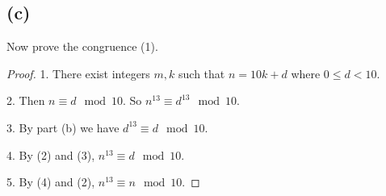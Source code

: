 \documentclass[14pt]{extarticle}
\begin{document}
\subsection{(c)}
Now prove the congruence (1).
\begin{proof}

1. There exist integers $m, k$ such that $n = 10k + d$ where $0 \leq d < 10$.

2. Then $n \equiv d \mod 10$. So $n^{13} \equiv d^{13} \mod 10$.

3. By part (b) we have $d^{13} \equiv d \mod 10$.

4. By (2) and (3), $n^{13} \equiv d \mod 10$.

5. By (4) and (2), $n^{13} \equiv n \mod 10$.
\end{proof}
\end{document}

